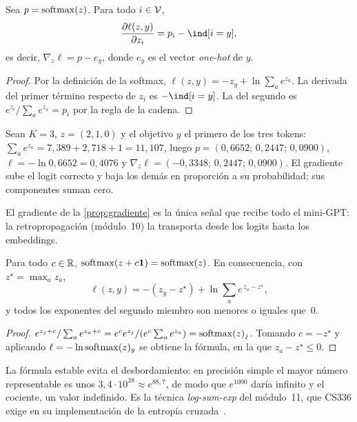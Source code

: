 \begin{proposicion}\label{prop:gradiente}
Sea $p=\operatorname{softmax}(z)$. Para todo $i\in\mathcal{V}$,
\[
\frac{\partial\ell(z,y)}{\partial z_i}=p_i-\ind[i=y],
\]
es decir, $\nabla_z\ell=p-e_y$, donde $e_y$ es el vector \emph{one-hot} de $y$.
\end{proposicion}

\begin{proof}
Por la definición de la softmax, $\ell(z,y)=-z_y+\ln\sum_{a}e^{z_a}$. La derivada del primer término respecto de $z_i$ es $-\ind[i=y]$. La del segundo es $e^{z_i}/\sum_a e^{z_a}=p_i$ por la regla de la cadena.
\end{proof}

\begin{ejemplo}\label{ej:gradiente}
Sean $K=3$, $z=(2,1,0)$ y el objetivo $y$ el primero de los tres tokens: $\sum_a e^{z_a}=7{,}389+2{,}718+1=11{,}107$, luego $p=(0{,}6652;\allowbreak\,0{,}2447;\allowbreak\,0{,}0900)$, $\ell=-\ln 0{,}6652=0{,}4076$ y $\nabla_z\ell=(-0{,}3348;\allowbreak\,0{,}2447;\allowbreak\,0{,}0900)$. El gradiente sube el logit correcto y baja los demás en proporción a su probabilidad; sus componentes suman cero.
\end{ejemplo}

El gradiente de la \cref{prop:gradiente} es la única señal que recibe todo el mini-GPT: la retropropagación (módulo~10) la transporta desde los logits hasta los embeddings.

\begin{proposicion}\label{prop:traslacion}
Para todo $c\in\mathbb{R}$, $\operatorname{softmax}(z+c\mathbf 1)=\operatorname{softmax}(z)$. En consecuencia, con $z^{\star}=\max_a z_a$,
\[
\ell(z,y)=-(z_y-z^{\star})+\ln\sum_{a}e^{\,z_a-z^{\star}},
\]
y todos los exponentes del segundo miembro son menores o iguales que~0.
\end{proposicion}

\begin{proof}
$e^{z_j+c}/\sum_a e^{z_a+c}=e^{c}e^{z_j}/(e^{c}\sum_a e^{z_a})=\operatorname{softmax}(z)_j$. Tomando $c=-z^{\star}$ y aplicando $\ell=-\ln\operatorname{softmax}(z)_y$ se obtiene la fórmula, en la que $z_a-z^{\star}\le 0$.
\end{proof}

La fórmula estable evita el desbordamiento: en precisión simple el mayor número representable es unos $3{,}4\cdot 10^{38}\approx e^{88{,}7}$, de modo que $e^{1000}$ daría infinito y el cociente, un valor indefinido. Es la técnica \emph{log-sum-exp} del módulo~11, que CS336 exige en su implementación de la entropía cruzada~\cite[§4.1]{cs336}.

